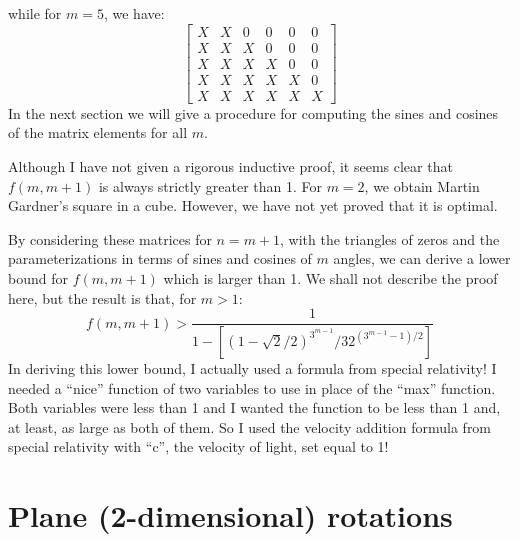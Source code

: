 while for $m = 5$, we have:
\begin{equation*}
\begin{bmatrix}
X & X & 0 & 0 & 0 & 0 \\
X & X & X & 0 & 0 & 0 \\
X & X & X & X & 0 & 0 \\
X & X & X & X & X & 0 \\
X & X & X & X & X & X
\end{bmatrix}
\end{equation*}
In the next section we will give a procedure for computing the sines and
cosines of the matrix elements for all $m$.

Although I have not given a rigorous inductive proof, it seems clear that
$f(m,m+1)$ is always strictly greater than 1.  For $m = 2$, we obtain Martin
Gardner's square in a cube.  However, we have not yet proved that it is
optimal.

By considering these matrices for $n = m+1$, with the triangles of zeros and
the parameterizations in terms of sines and cosines of $m$ angles, we can
derive a lower bound for $f(m,m+1)$ which is larger than 1.  We shall not
describe the proof here, but the result is that, for $m > 1$:
\begin{equation*}
f(m,m+1) > \frac{1}{1-[(1-\sqrt{2}/2)^{3^{m-1}}/32^{(3^{m-1}-1)/2}]}
\end{equation*}
\label{refpage28}
In deriving this lower bound, I actually used a formula from special
relativity!  I needed a ``nice'' function of two variables to use in place of
the ``max'' function.  Both variables were less than 1 and I wanted the
function to be less than 1 and, at least, as large as both of them.  So I used
the velocity addition formula from special relativity with ``c'', the velocity
of light, set equal to 1!

\section*{Plane (2-dimensional) rotations}

